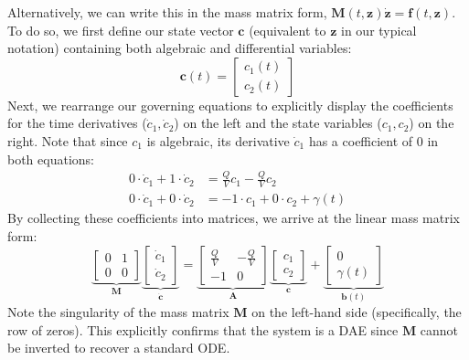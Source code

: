 Alternatively, we can write this in the mass matrix form, $\mathbf{M}(t, \mathbf{z})\dot{\mathbf{z}} = \mathbf{f}(t, \mathbf{z})$. To do so, we first define our state vector $\mathbf{c}$ (equivalent to $\mathbf{z}$ in our typical notation) containing both algebraic and differential variables:
\begin{equation}
    \mathbf{c}(t) = \begin{bmatrix} c_1(t) \\ c_2(t) \end{bmatrix}
\end{equation}
Next, we rearrange our governing equations to explicitly display the coefficients for the time derivatives ($\dot{c}_1, \dot{c}_2$) on the left and the state variables ($c_1, c_2$) on the right. Note that since $c_1$ is algebraic, its derivative $\dot{c}_1$ has a coefficient of 0 in both equations:
\begin{equation}
    \begin{aligned}
        0 \cdot \dot{c}_1 + 1 \cdot \dot{c}_2 &= \frac{Q}{V} c_1 - \frac{Q}{V} c_2 \\
        0 \cdot \dot{c}_1 + 0 \cdot \dot{c}_2 &= -1 \cdot c_1 + 0 \cdot c_2 + \gamma(t)
    \end{aligned}
\end{equation}
By collecting these coefficients into matrices, we arrive at the linear mass matrix form:
\begin{equation}
    \underbrace{\begin{bmatrix} 0 & 1 \\ 0 & 0 \end{bmatrix}}_{\mathbf{M}} 
    \underbrace{\begin{bmatrix} \dot{c}_1 \\ \dot{c}_2 \end{bmatrix}}_{\dot{\mathbf{c}}} 
    = 
    \underbrace{\begin{bmatrix} \frac{Q}{V} & -\frac{Q}{V} \\ -1 & 0 \end{bmatrix}}_{\mathbf{A}} 
    \underbrace{\begin{bmatrix} c_1 \\ c_2 \end{bmatrix}}_{\mathbf{c}} 
    + 
    \underbrace{\begin{bmatrix} 0 \\ \gamma(t) \end{bmatrix}}_{\mathbf{b}(t)}
\end{equation}
Note the singularity of the mass matrix $\mathbf{M}$ on the left-hand side (specifically, the row of zeros). This explicitly confirms that the system is a DAE since $\mathbf{M}$ cannot be inverted to recover a standard ODE.

